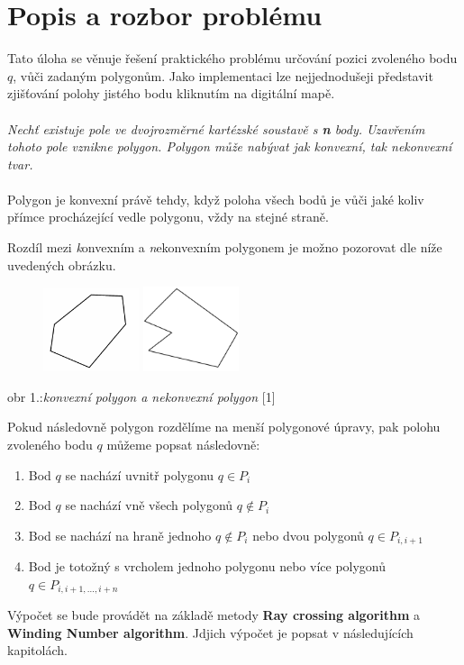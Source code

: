 \documentclass{article}
\begin{document}
\section{Popis a rozbor problému} %
\indent 
Tato úloha se věnuje řešení praktického problému určování pozici zvoleného bodu $q$, vůči zadaným polygonům. Jako implementaci lze nejjednodušeji představit zjišťování polohy jistého bodu kliknutím na digitální mapě. 
\\
\\
\textsl{Nechť existuje pole ve dvojrozměrné kartézské soustavě s \textbf n body. Uzavřením tohoto pole vznikne polygon. Polygon může nabývat jak konvexní, tak nekonvexní tvar.}
\\
\\
Polygon je konvexní právě tehdy, když poloha všech bodů je vůči jaké koliv přímce procházející vedle polygonu, vždy na stejné straně. 

Rozdíl mezi \textsl konvexním a  \textsl nekonvexním polygonem je možno pozorovat dle níže uvedených obrázku.
\begin{figure}[htbp]
\centering
        \includegraphics[clip, trim=0cm 0cm 0cm 0cm, width=0.2500\textwidth]{obrazek1.png}
 \includegraphics[clip, trim=0cm 0cm 0cm 0cm, width=0.2500\textwidth]{obrazek2.png}
\end{figure}
\bigskip
\begin{center}
obr 1.:\textsl{konvexní polygon  a   nekonvexní polygon} [1]
\end{center}
Pokud následovně polygon rozdělíme na menší polygonové úpravy, pak polohu zvoleného bodu $q$ můžeme popsat následovně: 
\begin{enumerate}
\item   Bod $q$ se nachází uvnitř polygonu  $q {\in} P_i$ 
\item   Bod $q$ se nachází vně všech polygonů  $q {\not \in} P_i$ 
\item   Bod se nachází na hraně jednoho  $q {\not \in} P_i$ nebo dvou polygonů $q {\in} P_{i,i+1}$ 
\item   Bod je totožný s vrcholem jednoho polygonu nebo více polygonů $q {\in} P_{i,i+1,...,i+n}$
\end{enumerate}
Výpočet se bude provádět na základě metody \textbf {Ray crossing algorithm} a  \textbf {Winding Number algorithm}. Jdjich výpočet je popsat v následujících kapitolách. 
\\
\clearpage
\end{document}
